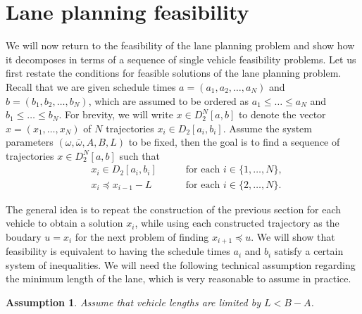 \documentclass[a4paper]{report}
\theoremstyle{definition}
\theoremstyle{plain}
\newtheorem{assump}{Assumption}[chapter]
\begin{document}
\section{Lane planning feasibility}\label{sec:lane-problem-feasibility}

We will now return to the feasibility of the lane planning problem and show how
it decomposes in terms of a sequence of single vehicle feasibility problems.
%
Let us first restate the conditions for feasible solutions of the lane planning
problem.
%
Recall that we are given schedule times $a = (a_{1}, a_{2}, \dots, a_{N})$ and
$b = (b_{1}, b_{2}, \dots, b_{N})$, which are assumed to be ordered as
$a_{1} \leq \dots \leq a_{N}$ and
$b_{1} \leq \dots \leq b_{N}$.
%
For brevity, we will write $x \in D_{2}^{N}[a, b]$ to denote the vector
$x = (x_{1}, \dots, x_{N})$ of $N$ trajectories $x_{i} \in D_{2}[a_{i},b_{i}]$.
%
Assume the system parameters $(\omega, \bar{\omega},A,B,L)$ to be fixed, then
the goal is to find a sequence of trajectories $x \in D_{2}^{N}[a,b]$ such that
\begin{subequations}
\begin{alignat}{2}
  &x_{i} \in D_2[a_{i},b_{i}] && \quad \text{ for each } i \in \{1, \dots, N\} , \\
  &x_{i} \preceq x_{i-1} - L && \quad \text{ for each } i \in \{2, \dots, N\} . \label{eq:follow-constraint}
\end{alignat}
\end{subequations}

%
The general idea is to repeat the construction of the previous section for each
vehicle to obtain a solution $x_{i}$, while using each constructed trajectory as
the boudary $u = x_{i}$ for the next problem of finding $x_{i+1} \preceq u$.
%
We will show that feasibility is equivalent to having the schedule times $a_{i}$
and $b_{i}$ satisfy a certain system of inequalities.
%
We will need the following technical assumption regarding the minimum length of
the lane, which is very reasonable to assume in practice.

\begin{assump}\label{assump:L-bound}
  Assume that vehicle lengths are limited by $L < B - A$.
\end{assump}
\end{document}
